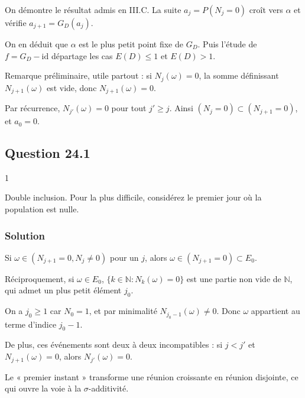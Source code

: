 \documentclass[11pt,a4paper]{article}
\newcommand{\equationajustee}[1]{%
  \sbox{\boiteequation}{$\displaystyle #1$}%
  \ifdim\wd\boiteequation>\linewidth
    \[\resizebox{\linewidth}{!}{\usebox{\boiteequation}}\]%
  \else
    \[#1\]%
  \fi}
\begin{document}
On démontre le résultat admis en III.C. La suite \(a_j=P(N_j=0)\) croît vers \(\alpha\) et vérifie \(a_{j+1}=G_D(a_j)\).

On en déduit que \(\alpha\) est le plus petit point fixe de \(G_D\). Puis l'étude de \(f=G_D-\mathrm{id}\) départage les cas \(E(D)\le1\) et \(E(D)>1\).

Remarque préliminaire, utile partout : si \(N_j(\omega)=0\), la somme définissant \(N_{j+1}(\omega)\) est vide, donc \(N_{j+1}(\omega)=0\).

Par récurrence, \(N_{j'}(\omega)=0\) pour tout \(j'\ge j\). Ainsi \((N_j=0)\subset(N_{j+1}=0)\), et \(a_0=0\).

\hypertarget{question-24.1}{%
\subsection{Question 24.1}\label{question-24.1}}

\begin{indication}{1}

Double inclusion. Pour la plus difficile, considérez le premier jour où la population est nulle.

\end{indication}

\hypertarget{solution-51}{%
\subsubsection{Solution}\label{solution-51}}

Si \(\omega\in(N_{j+1}=0,N_j\ne0)\) pour un \(j\), alors \(\omega\in(N_{j+1}=0)\subset E_0\).

Réciproquement, si \(\omega\in E_0\), \(\{k\in\mathbb N:N_k(\omega)=0\}\)
est une partie non vide de \(\mathbb N\), qui admet un plus petit élément \(j_0\).

On a \(j_0\ge1\) car \(N_0=1\), et par minimalité \(N_{j_0-1}(\omega)\ne0\). Donc \(\omega\) appartient au terme d'indice \(j_0-1\).

\equationajustee{\boxed{E_0=\bigcup_{j\in\mathbb N}(N_{j+1}=0,\ N_j\ne0)}}

De plus, ces événements sont deux à deux incompatibles : si \(j<j'\) et \(N_{j+1}(\omega)=0\), alors \(N_{j'}(\omega)=0\).

\begin{methode}

Le « premier instant » transforme une réunion croissante en réunion disjointe, ce qui ouvre la voie à la \(\sigma\)-additivité.

\end{methode}
\end{document}
